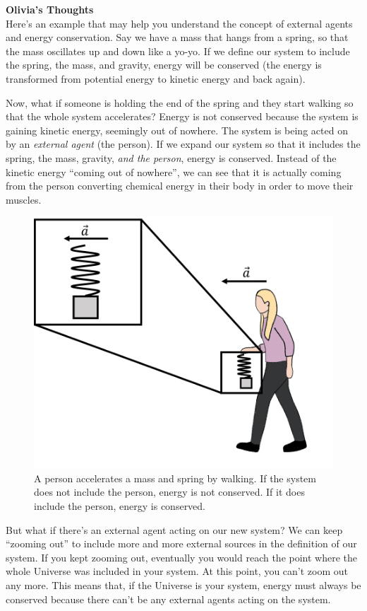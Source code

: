 \begin{framed}
\textbf{Olivia's Thoughts}\\
Here's an example that may help you understand the concept of external agents and energy conservation. Say we have a mass that hangs from a spring, so that the mass oscillates up and down like a yo-yo. If we define our system to include the spring, the mass, and gravity, energy will be conserved (the energy is transformed from potential energy to kinetic energy and back again).

Now, what if someone is holding the end of the spring and they start walking so that the whole system accelerates? Energy is not conserved because the system is gaining kinetic energy, seemingly out of nowhere. The system is being acted on by an \textit{external agent} (the person). If we expand our system so that it includes the spring, the mass, gravity, \textit{and the person}, energy is conserved. Instead of the kinetic energy ``coming out of nowhere'', we can see that it is actually coming from the person converting chemical energy in their body in order to move their muscles.

\begin{figure}[!htbp]
\centering
\includegraphics[width=0.4\linewidth]{files/externalagentex-66771caacaa3f48d61e159995851589f.png}
\caption[]{A person accelerates a mass and spring by walking. If the system does not include the person, energy is not conserved. If it does include the person, energy is conserved.}
\label{fig:potentialecons:externalagentx}
\end{figure}

But what if there's an external agent acting on our new system? We can keep ``zooming out'' to include more and more external sources in the definition of our system. If you kept zooming out, eventually you would reach the point where the whole Universe was included in your system. At this point, you can't zoom out any more. This means that, if the Universe is your system, energy must always be conserved because there can't be any external agents acting on the system.
\end{framed}

